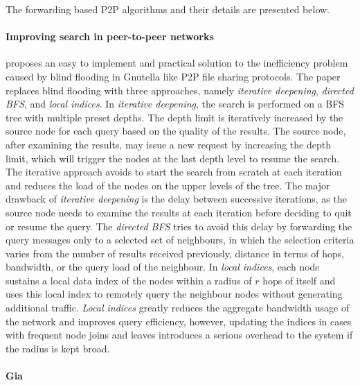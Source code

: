 \documentclass[acmcsur]{acmtrans2m}
\begin{document}
The forwarding based P2P algorithms and their details are presented below.

\paragraph*{\bf Improving search in peer-to-peer networks}

\cite{yang_improvep2psearch_2002} proposes an easy to implement and practical
solution to the inefficiency problem caused by blind flooding in Gnutella like
P2P file sharing protocols. The paper replaces blind flooding with three
approaches, namely \textit{iterative deepening}, \textit{directed BFS}, and
\textit{local indices}. In \textit{iterative deepening}, the search is performed
on a BFS tree with multiple preset depths. The depth limit is iteratively
increased by the source node for each query based on the quality of the results.
The source node, after examining the results, may issue a new request by
increasing the depth limit, which will trigger the nodes at the last depth
level to resume the search. The iterative approach avoids to start the search
from scratch at each iteration and reduces the load of the nodes on the upper
levels of the tree. The major drawback of \textit{iterative deepening} is the
delay between successive iterations, as the source node needs to examine the
results at each iteration before deciding to quit or resume the query.  The
\textit{directed BFS} tries to avoid this delay by forwarding the query messages
only to a selected set of neighbours, in which the selection criteria varies
from the number of results received previously, distance in terms of hops,
bandwidth, or the query load of the neighbour. In \textit{local indices}, each
node sustains a local data index of the nodes within a radius of $r$ hops of
itself and uses this local index to remotely query the neighbour nodes without
generating additional traffic.  \textit{Local indices} greatly reduces the
aggregate bandwidth usage of the network and improves query efficiency, however,
updating the indices in cases with frequent node joins and leaves introduces a
serious overhead to the system if the radius is kept broad.

\paragraph*{\bf Gia}
\end{document}
